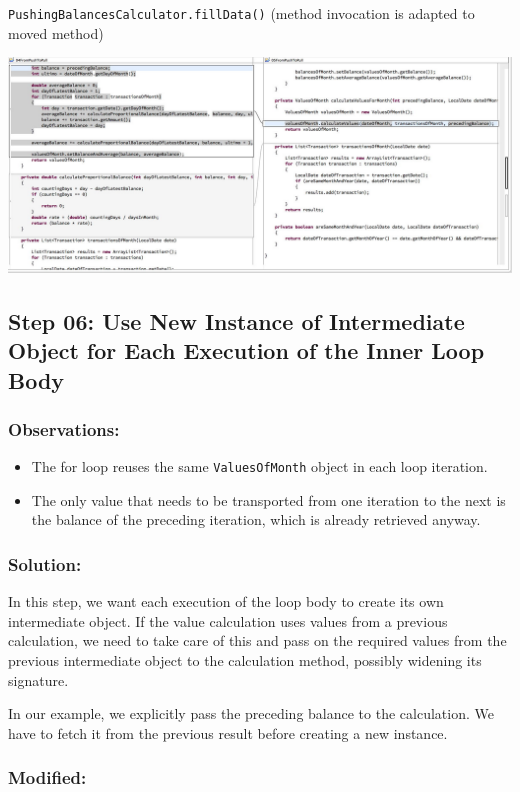 \documentclass[a4paper,fleqn,titlepage,11pt]{article}
\begin{document}
\texttt{PushingBalancesCalculator.fillData()} (method invocation is adapted to moved method)

\includegraphics[width=1\textwidth]{CompareViews/04-05-2.jpg}

\subsection*{Step 06: Use New Instance of Intermediate Object for Each Execution of the Inner Loop Body}

\subsubsection*{Observations:}
\begin{itemize}
\item The for loop reuses the same \texttt{ValuesOfMonth} object in each loop iteration.
\item The only value that needs to be transported from one iteration to the next is the balance of the preceding iteration, which is already retrieved anyway.
\end{itemize}

\subsubsection*{Solution:}


In this step, we want each execution of the loop body to create its own intermediate object. If the value calculation uses values from a previous calculation, we need to take care of this and pass on the required values from the previous intermediate object to the calculation method, possibly widening its signature.

In our example, we explicitly pass the preceding balance to the calculation. We have to fetch it from the previous result before creating a new instance.

\subsubsection*{Modified:}
\end{document}
